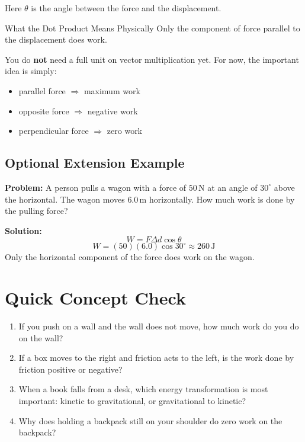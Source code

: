 Here $\theta$ is the angle between the force and the displacement.

\begin{keyidea}{What the Dot Product Means Physically}
Only the component of force parallel to the displacement does work.
\end{keyidea}

You do \textbf{not} need a full unit on vector multiplication yet. For now, the important idea is simply:
\begin{itemize}
    \item parallel force $\Rightarrow$ maximum work
    \item opposite force $\Rightarrow$ negative work
    \item perpendicular force $\Rightarrow$ zero work
\end{itemize}

\subsection*{Optional Extension Example}
\textbf{Problem:} A person pulls a wagon with a force of $50\,\text{N}$ at an angle of $30^\circ$ above the horizontal. The wagon moves $6.0\,\text{m}$ horizontally. How much work is done by the pulling force?

\textbf{Solution:}
\begin{equation*}
    W = F \Delta d \cos \theta
\end{equation*}
\begin{equation*}
    W = (50)(6.0)\cos 30^\circ \approx 260\,\text{J}
\end{equation*}
Only the horizontal component of the force does work on the wagon.

\section{Quick Concept Check}
\begin{enumerate}
    \item If you push on a wall and the wall does not move, how much work do you do on the wall?
    \item If a box moves to the right and friction acts to the left, is the work done by friction positive or negative?
    \item When a book falls from a desk, which energy transformation is most important: kinetic to gravitational, or gravitational to kinetic?
    \item Why does holding a backpack still on your shoulder do zero work on the backpack?
\end{enumerate}

